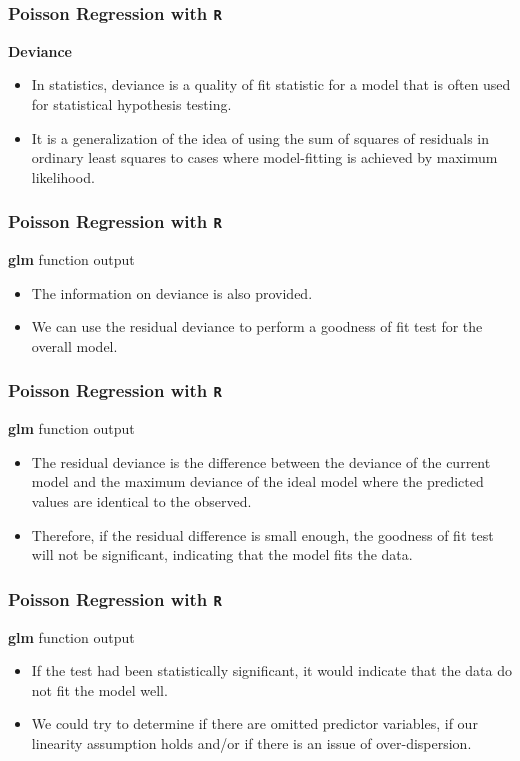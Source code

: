 \documentclass[MASTER.tex]{subfiles}
\begin{document}
\begin{frame}[fragile]
\frametitle{Poisson Regression with \texttt{R}}
\Large 
\textbf{Deviance}
\begin{itemize}
\item In statistics, deviance is a quality of fit statistic for a model that is often used for statistical hypothesis testing. 
\item It is a generalization of the idea of using the sum of squares of residuals in ordinary least squares to cases where model-fitting is achieved by maximum likelihood.
\end{itemize}
\end{frame}
\begin{frame}[fragile]
\frametitle{Poisson Regression with \texttt{R}}
\Large 
\textbf{glm} function output
\begin{itemize}
\item The information on deviance is also provided. 
\item We can use the residual deviance to perform a goodness of fit test for the overall model. 

\end{itemize}
\end{frame}
\begin{frame}[fragile]
\frametitle{Poisson Regression with \texttt{R}}
\Large 
\textbf{glm} function output
\begin{itemize}
\item The residual deviance is the difference between the deviance of the current model and the maximum deviance of the ideal model where the predicted values are identical to the observed. \smallskip
\item Therefore, if the residual difference is small enough, the goodness of fit test will not be significant, indicating that the model fits the data. 

\end{itemize}
\end{frame}
\begin{frame}[fragile]
\frametitle{Poisson Regression with \texttt{R}}
\Large 
\textbf{glm} function output
\begin{itemize}
\item If the test had been statistically significant, it would indicate that the data do not fit the model well. 
\item We could try to determine if there are omitted predictor variables, if our linearity assumption holds and/or if there is an issue of over-dispersion. 
\end{itemize}
\end{frame}
\end{document}
